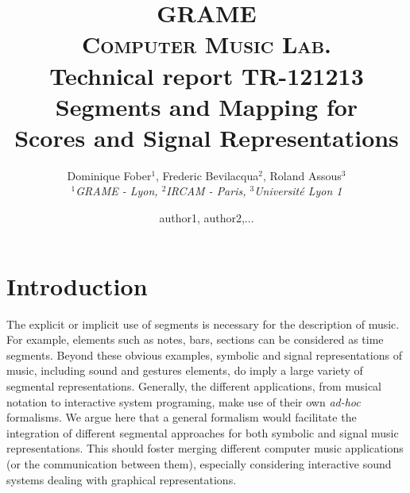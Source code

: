 \documentclass[letterpaper, 12pt]{article}
\begin{document}
\else

\title{\vspace{-5mm}
{\small \textsc {GRAME \\ 
Computer Music Lab.  \\}}
\vspace {-4mm}
{\normalsize Technical report TR-121213}\\
\vspace {4mm}
Segments and Mapping for \\Scores and Signal Representations}

\ifdefined \finalversion
\author{Dominique Fober$^{1}$, Frederic Bevilacqua$^{2}$, Roland Assous$^{3}$ \\
{\small \textit{$^{1}$GRAME - Lyon, $^{2}$IRCAM - Paris, $^{3}$Université Lyon 1}}}
\else
\author{author1, author2,...}
\fi
\date{}

\maketitle
\thispagestyle{empty}
\pagestyle{empty}

\fi




\ifdefined \keywords
{}
\fi

\section{Introduction}

The explicit or implicit use of segments is necessary for the description of music. For example, elements such as notes, bars, sections can be considered as time segments. Beyond these obvious examples, symbolic and signal representations of music, including sound and gestures elements, do imply a large variety of segmental representations. Generally, the different applications, from musical notation to interactive system programing, make use of their own \emph{ad-hoc} formalisms. We argue here that a general formalism would facilitate the integration of different segmental approaches for both symbolic and signal music representations.  This should foster merging different computer music applications (or the communication between them), especially considering interactive sound systems dealing with graphical representations.
\end{document}
